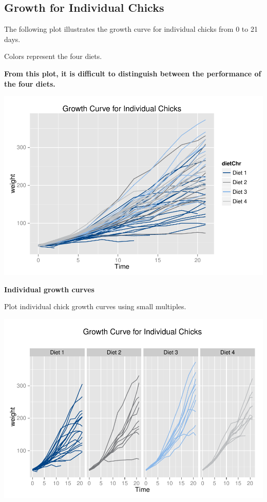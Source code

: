 \documentclass[10pt]{article}
\newenvironment{CodeChunk}{}{}
\begin{document}
\subsection*{Growth for Individual
Chicks}\label{growth-for-individual-chicks}

The following plot illustrates the growth curve for individual chicks
from 0 to 21 days.

Colors represent the four diets.

\textbf{From this plot, it is difficult to distinguish between the
performance of the four diets.}

\begin{CodeChunk}

\includegraphics{ReproducibleResearchDemo_files/figure-latex/unnamed-chunk-9-1} \end{CodeChunk}

\textbf{Individual growth curves}

Plot individual chick growth curves using small multiples.

\begin{CodeChunk}

\includegraphics{ReproducibleResearchDemo_files/figure-latex/unnamed-chunk-10-1} \end{CodeChunk}
\end{document}
